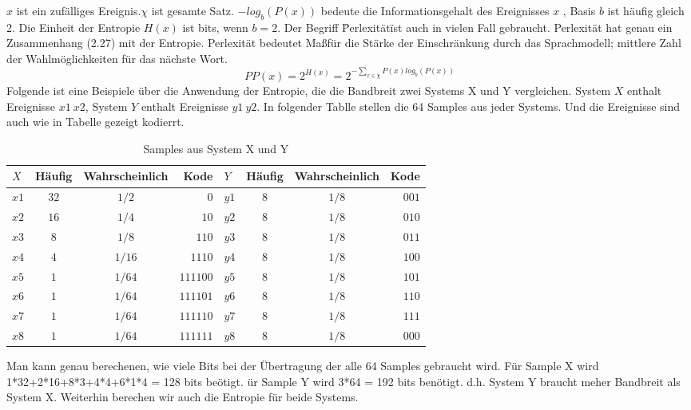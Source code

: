 $x$ ist ein zuf\"alliges Ereignis.$\chi$ ist gesamte Satz. $-log_{b}(P(x))$ bedeute die Informationsgehalt des Ereignisses $x$ , Basis $b$ ist h\"aufig gleich 2. Die Einheit der Entropie $H(x)$ ist bits, wenn $b=2$.
Der Begriff \"Perlexit\"at\" ist auch in vielen Fall gebraucht. Perlexit\"at hat genau ein Zusammenhang (2.27) mit der Entropie. Perlexit\"at bedeutet Ma\ss f\"ur die St\"arke der Einschr\"ankung durch das Sprachmodell; mittlere Zahl der Wahlm\"oglichkeiten f\"ur das n\"achste Wort.
\begin{equation}
\label{equation:bewertung_02}
PP(x)=2^{H(x)}=2^{-\sum_{x\in\chi}P(x)log_{b}(P(x))}
\end{equation}
Folgende ist eine Beispiele \"uber die Anwendung der Entropie, die die Bandbreit zwei Systems X und Y vergleichen. System $X$ enthalt Ereignisse $x1~x2$, System $Y$ enthalt Ereignisse $y1~y2$. In folgender Tablle stellen die 64 Samples aus jeder Systems. Und die Ereignisse sind auch wie in Tabelle gezeigt kodierrt.
\begin{table}[h]
  \begin{center}
    \begin{tabular}{lccrlccr}
      \toprule
      \bf $X$ & \bf H\"aufig & \bf Wahrscheinlich & \bf Kode 
   	& \bf $Y$ & \bf H\"aufig & \bf Wahrscheinlich & \bf Kode\\    
      \midrule     
      $x1$ 		&  $32$ 		 	& $1/2$  							& $0$	
    & $y1$		&  $8$ 		 		& $1/8$  							& $001$	\\
      $x2$ 		&  $16$ 			& $1/4$  							& $10$
    & $y2$		&  $8$ 		 		& $1/8$  							& $010$	\\
     	$x3$ 		&  $8$ 		 		& $1/8$  							& $110$	
    & $y3$		&  $8$ 		 		& $1/8$  							& $011$	\\
      $x4$ 		&  $4$ 				& $1/16$  						& $1110$
    & $y4$		&  $8$ 		 		& $1/8$  							& $100$	\\
     	$x5$ 		&  $1$ 		 		& $1/64$   						& $111100$	
    & $y5$		&  $8$ 		 		& $1/8$  							& $101$	\\
      $x6$ 		&  $1$ 				& $1/64$  						& $111101$
   	& $y6$		&  $8$ 		 		& $1/8$  							& $110$	\\
     	$x7$ 		&  $1$ 		 		& $1/64$  						& $111110$	
    & $y7$		&  $8$ 		 		& $1/8$  							& $111$	\\
      $x8$ 		&  $1$ 				& $1/64$  						& $111111$
    & $y8$		&  $8$ 		 		& $1/8$  							& $000$	\\     
      \bottomrule
    \end{tabular}
  \end{center}
\caption{Samples aus System X und Y}
\label{tab:table_2}
\end{table}

Man kann genau berechenen, wie viele Bits bei der \"Ubertragung der alle 64 Samples gebraucht wird. F\"ur Sample X wird 1*32+2*16+8*3+4*4+6*1*4 = 128 bits be\"otigt. \"ur Sample Y wird 3*64 = 192 bits ben\"otigt. d.h. System Y braucht meher Bandbreit als System X. Weiterhin berechen wir auch die Entropie f\"ur beide Systems.